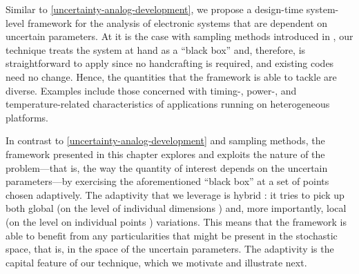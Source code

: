 Similar to \cref{uncertainty-analog-development}, we propose a design-time
system-level framework for the analysis of electronic systems that are dependent
on uncertain parameters. At it is the case with sampling methods introduced in
, our technique treats the system at hand as a ``black box'' and,
therefore, is straightforward to apply since no handcrafting is required, and
existing codes need no change. Hence, the quantities that the framework is able
to tackle are diverse. Examples include those concerned with timing-, power-,
and temperature-related characteristics of applications running on heterogeneous
platforms.

In contrast to \cref{uncertainty-analog-development} and sampling methods, the
framework presented in this chapter explores and exploits the nature of the
problem---that is, the way the quantity of interest depends on the uncertain
parameters---by exercising the aforementioned ``black box'' at a set of points
chosen adaptively. The adaptivity that we leverage is hybrid \cite{jakeman2012}:
it tries to pick up both global (on the level of individual dimensions
\cite{klimke2006}) and, more importantly, local (on the level on individual
points \cite{ma2009}) variations. This means that the framework is able to
benefit from any particularities that might be present in the stochastic space,
that is, in the space of the uncertain parameters. The adaptivity is the capital
feature of our technique, which we motivate and illustrate next.
